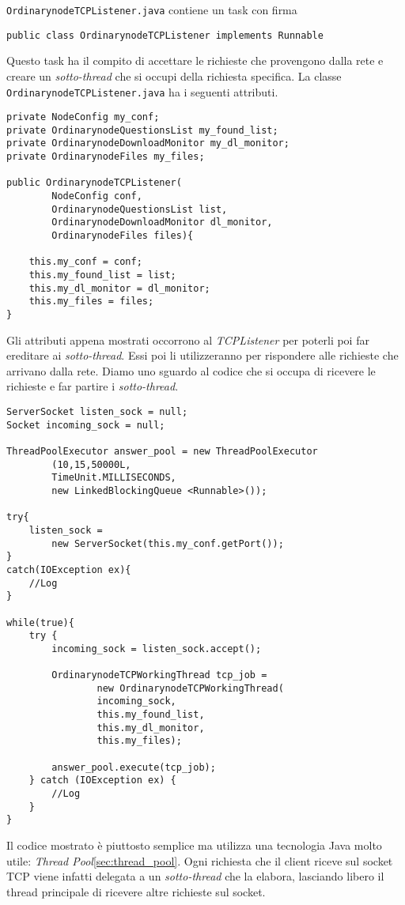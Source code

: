 \verb|OrdinarynodeTCPListener.java| contiene un task con firma
\begin{verbatim}
public class OrdinarynodeTCPListener implements Runnable
\end{verbatim}

Questo task ha il compito di accettare le richieste che provengono dalla rete e creare un \emph{sotto-thread} che si occupi della richiesta specifica.
La classe \verb|OrdinarynodeTCPListener.java| ha i seguenti attributi.
\begin{lstlisting}
private NodeConfig my_conf;
private OrdinarynodeQuestionsList my_found_list;
private OrdinarynodeDownloadMonitor my_dl_monitor;
private OrdinarynodeFiles my_files;

public OrdinarynodeTCPListener(
		NodeConfig conf,
		OrdinarynodeQuestionsList list,
		OrdinarynodeDownloadMonitor dl_monitor,
		OrdinarynodeFiles files){

	this.my_conf = conf;
	this.my_found_list = list;
	this.my_dl_monitor = dl_monitor;
	this.my_files = files;
}
\end{lstlisting}
Gli attributi appena mostrati occorrono al \emph{TCPListener} per poterli poi far ereditare ai \emph{sotto-thread}. Essi poi li utilizzeranno per rispondere alle richieste che arrivano dalla rete.
Diamo uno sguardo al codice che si occupa di ricevere le richieste e far partire i \emph{sotto-thread}.
\begin{lstlisting}
ServerSocket listen_sock = null;
Socket incoming_sock = null;

ThreadPoolExecutor answer_pool = new ThreadPoolExecutor
		(10,15,50000L,
		TimeUnit.MILLISECONDS, 
		new LinkedBlockingQueue <Runnable>());

try{
	listen_sock = 
		new ServerSocket(this.my_conf.getPort());
}
catch(IOException ex){
	//Log
}

while(true){
	try {
		incoming_sock = listen_sock.accept();
		
		OrdinarynodeTCPWorkingThread tcp_job = 
				new OrdinarynodeTCPWorkingThread(
				incoming_sock,
				this.my_found_list,
				this.my_dl_monitor,
				this.my_files);

		answer_pool.execute(tcp_job);
	} catch (IOException ex) {
		//Log
	}
}
\end{lstlisting}
Il codice mostrato è piuttosto semplice ma utilizza una tecnologia Java molto utile: \emph{Thread Pool}\ref{sec:thread_pool}.
Ogni richiesta che il client riceve sul socket TCP viene infatti delegata a un \emph{sotto-thread} che la elabora, lasciando libero il thread principale di ricevere altre richieste sul socket.

